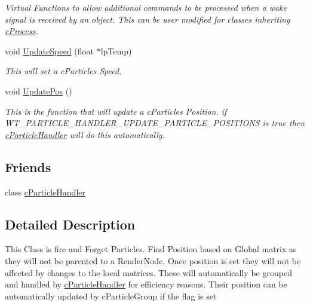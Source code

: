 \begin{DoxyCompactItemize}
\begin{DoxyCompactList}\small\item\em Virtual Functions to allow additional commands to be processed when a wake signal is received by an object. This can be user modified for classes inheriting \hyperlink{classc_process}{cProcess}. \end{DoxyCompactList}\item 
\hypertarget{classc_particle_a208780eb109c709449a2edd3f7867e51}{
void \hyperlink{classc_particle_a208780eb109c709449a2edd3f7867e51}{UpdateSpeed} (float $\ast$lpTemp)}
\label{classc_particle_a208780eb109c709449a2edd3f7867e51}

\begin{DoxyCompactList}\small\item\em This will set a cParticles Speed. \end{DoxyCompactList}\item 
\hypertarget{classc_particle_a029fe14e7b4a67e6a7864b86772b283b}{
void \hyperlink{classc_particle_a029fe14e7b4a67e6a7864b86772b283b}{UpdatePos} ()}
\label{classc_particle_a029fe14e7b4a67e6a7864b86772b283b}

\begin{DoxyCompactList}\small\item\em This is the function that will update a cParticles Position. if WT\_\-PARTICLE\_\-HANDLER\_\-UPDATE\_\-PARTICLE\_\-POSITIONS is true then \hyperlink{classc_particle_handler}{cParticleHandler} will do this automatically. \end{DoxyCompactList}\end{DoxyCompactItemize}
\subsection*{Friends}
\begin{DoxyCompactItemize}
\item 
\hypertarget{classc_particle_ad810bc5f0330a0154ffaabe8d256379c}{
class \hyperlink{classc_particle_ad810bc5f0330a0154ffaabe8d256379c}{cParticleHandler}}
\label{classc_particle_ad810bc5f0330a0154ffaabe8d256379c}

\end{DoxyCompactItemize}


\subsection{Detailed Description}
This Class is fire and Forget Particles. Find Position based on Global matrix as they will not be parented to a RenderNode. Once position is set they will not be affected by changes to the local matrices. These will automatically be grouped and handled by \hyperlink{classc_particle_handler}{cParticleHandler} for efficiency reasons. Their position can be automatically updated by cParticleGroup if the flag is set 